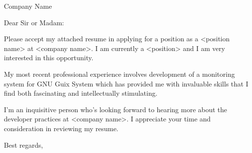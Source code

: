 \documentclass{letter}
\begin{document}
\begin{letter}{Company Name}
  \opening{Dear Sir or Madam:}


  Please accept my attached resume in applying for a position as a <position
  name> at <company name>. I am currently a <position> and I am very interested 
  in this opportunity.


  My most recent professional experience involves development of a monitoring system 
  for GNU Guix System which has provided me with invaluable skills that I find both 
  fascinating and intellectually stimulating. 

  
  I'm an inquisitive person who's looking forward to hearing more about the developer practices 
  at <company name>. I appreciate your time and consideration in reviewing my resume.

\closing{Best regards,}

\end{letter}
\end{document}
